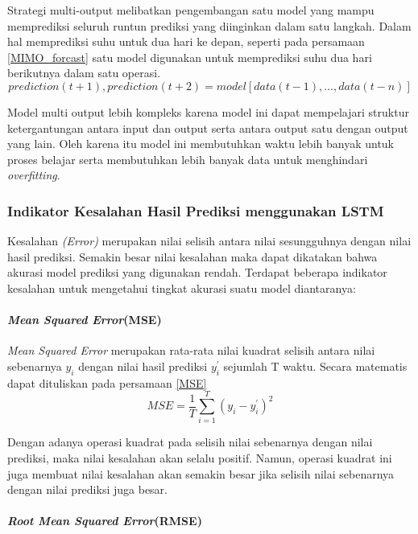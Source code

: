\documentclass[../thesis.tex]{subfiles}
\begin{document}
Strategi multi-output melibatkan pengembangan satu model yang mampu memprediksi seluruh runtun prediksi yang diinginkan dalam satu langkah.
Dalam hal memprediksi suhu untuk dua hari ke depan, seperti pada persamaan \ref{MIMO_forcast} satu model digunakan untuk memprediksi suhu dua hari berikutnya dalam satu operasi.
\begin{equation} \label{MIMO_forcast}
		prediction(t+1), prediction(t+2) = model[data(t-1), ..., data(t-n)]
\end{equation}

Model multi output lebih kompleks karena model ini dapat mempelajari struktur ketergantungan antara input dan output serta antara output satu dengan output yang lain.
Oleh karena itu model ini membutuhkan waktu lebih banyak untuk proses belajar serta membutuhkan lebih banyak data untuk menghindari \textit{overfitting}.

\subsubsection{Indikator Kesalahan Hasil Prediksi menggunakan LSTM}
Kesalahan \textit{(Error)} merupakan nilai selisih antara nilai sesungguhnya dengan nilai hasil prediksi. Semakin besar nilai kesalahan maka dapat dikatakan bahwa akurasi model prediksi 
yang digunakan rendah. Terdapat beberapa indikator kesalahan untuk mengetahui tingkat akurasi suatu model diantaranya:

\paragraph{\textit{Mean Squared Error}(MSE)} 

\textit{Mean Squared Error} merupakan rata-rata nilai kuadrat selisih antara nilai sebenarnya $y_i$ dengan nilai hasil prediksi $y^{'}_i$ sejumlah T waktu. Secara matematis dapat dituliskan pada persamaan \ref{MSE}
\begin{equation}\label{MSE}
	MSE = \frac {1}{T}\sum \limits_{i=1}^{T} {(y_i - y^{'}_i)^2}
\end{equation}

Dengan adanya operasi kuadrat pada selisih nilai sebenarnya dengan nilai prediksi, maka nilai kesalahan akan selalu positif. Namun, operasi kuadrat ini juga membuat nilai kesalahan 
akan semakin besar jika selisih nilai sebenarnya dengan nilai prediksi juga besar.


\paragraph{\textit{Root Mean Squared Error}(RMSE)}
\end{document}
